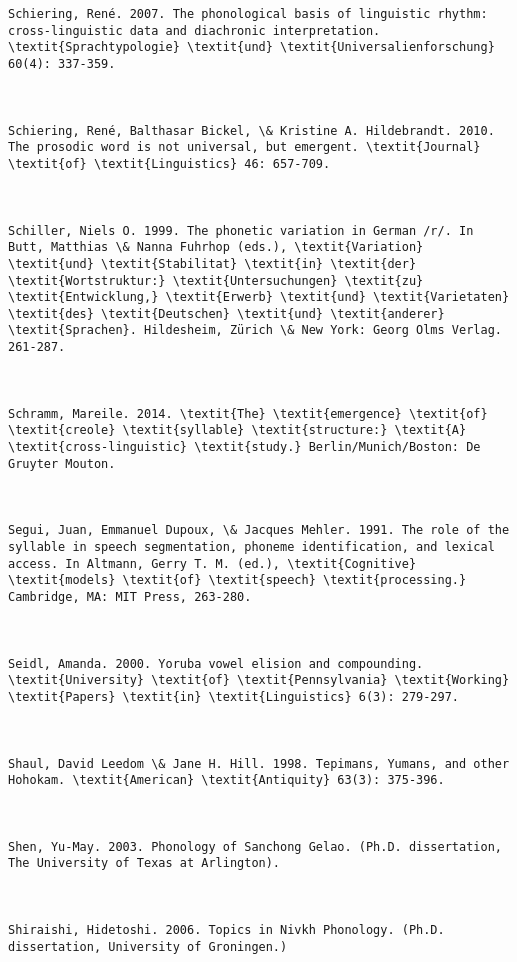 \begin{verbatim}
Schiering, René. 2007. The phonological basis of linguistic rhythm: cross-linguistic data and diachronic interpretation. \textit{Sprachtypologie} \textit{und} \textit{Universalienforschung} 60(4): 337-359.



Schiering, René, Balthasar Bickel, \& Kristine A. Hildebrandt. 2010. The prosodic word is not universal, but emergent. \textit{Journal} \textit{of} \textit{Linguistics} 46: 657-709.



Schiller, Niels O. 1999. The phonetic variation in German /r/. In Butt, Matthias \& Nanna Fuhrhop (eds.), \textit{Variation} \textit{und} \textit{Stabilitat} \textit{in} \textit{der} \textit{Wortstruktur:} \textit{Untersuchungen} \textit{zu} \textit{Entwicklung,} \textit{Erwerb} \textit{und} \textit{Varietaten} \textit{des} \textit{Deutschen} \textit{und} \textit{anderer} \textit{Sprachen}. Hildesheim, Zürich \& New York: Georg Olms Verlag. 261-287.



Schramm, Mareile. 2014. \textit{The} \textit{emergence} \textit{of} \textit{creole} \textit{syllable} \textit{structure:} \textit{A} \textit{cross-linguistic} \textit{study.} Berlin/Munich/Boston: De Gruyter Mouton.



Segui, Juan, Emmanuel Dupoux, \& Jacques Mehler. 1991. The role of the syllable in speech segmentation, phoneme identification, and lexical access. In Altmann, Gerry T. M. (ed.), \textit{Cognitive} \textit{models} \textit{of} \textit{speech} \textit{processing.} Cambridge, MA: MIT Press, 263-280.



Seidl, Amanda. 2000. Yoruba vowel elision and compounding. \textit{University} \textit{of} \textit{Pennsylvania} \textit{Working} \textit{Papers} \textit{in} \textit{Linguistics} 6(3): 279-297.



Shaul, David Leedom \& Jane H. Hill. 1998. Tepimans, Yumans, and other Hohokam. \textit{American} \textit{Antiquity} 63(3): 375-396.



Shen, Yu-May. 2003. Phonology of Sanchong Gelao. (Ph.D. dissertation, The University of Texas at Arlington).



Shiraishi, Hidetoshi. 2006. Topics in Nivkh Phonology. (Ph.D. dissertation, University of Groningen.) 




\end{verbatim}
